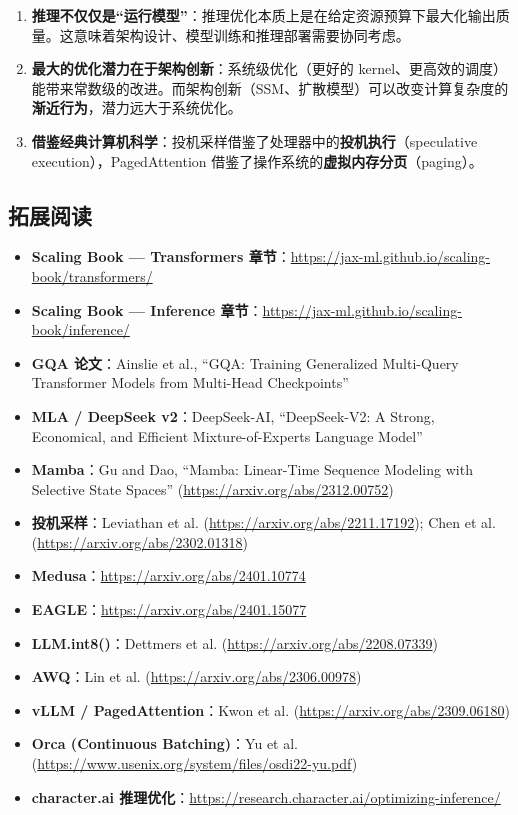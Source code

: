 \documentclass[a4paper]{article}
\begin{document}
\begin{enumerate}
    \item \textbf{推理不仅仅是``运行模型''}：推理优化本质上是在给定资源预算下最大化输出质量。这意味着架构设计、模型训练和推理部署需要协同考虑。

    \item \textbf{最大的优化潜力在于架构创新}：系统级优化（更好的 kernel、更高效的调度）能带来常数级的改进。而架构创新（SSM、扩散模型）可以改变计算复杂度的\textbf{渐近行为}，潜力远大于系统优化。

    \item \textbf{借鉴经典计算机科学}：投机采样借鉴了处理器中的\textbf{投机执行}（speculative execution），PagedAttention 借鉴了操作系统的\textbf{虚拟内存分页}（paging）。
\end{enumerate}

\subsection{拓展阅读}

\begin{itemize}
    \item \textbf{Scaling Book --- Transformers 章节}：\url{https://jax-ml.github.io/scaling-book/transformers/}
    \item \textbf{Scaling Book --- Inference 章节}：\url{https://jax-ml.github.io/scaling-book/inference/}
    \item \textbf{GQA 论文}：Ainslie et al., ``GQA: Training Generalized Multi-Query Transformer Models from Multi-Head Checkpoints''
    \item \textbf{MLA / DeepSeek v2}：DeepSeek-AI, ``DeepSeek-V2: A Strong, Economical, and Efficient Mixture-of-Experts Language Model''
    \item \textbf{Mamba}：Gu and Dao, ``Mamba: Linear-Time Sequence Modeling with Selective State Spaces'' (\url{https://arxiv.org/abs/2312.00752})
    \item \textbf{投机采样}：Leviathan et al. (\url{https://arxiv.org/abs/2211.17192}); Chen et al. (\url{https://arxiv.org/abs/2302.01318})
    \item \textbf{Medusa}：\url{https://arxiv.org/abs/2401.10774}
    \item \textbf{EAGLE}：\url{https://arxiv.org/abs/2401.15077}
    \item \textbf{LLM.int8()}：Dettmers et al. (\url{https://arxiv.org/abs/2208.07339})
    \item \textbf{AWQ}：Lin et al. (\url{https://arxiv.org/abs/2306.00978})
    \item \textbf{vLLM / PagedAttention}：Kwon et al. (\url{https://arxiv.org/abs/2309.06180})
    \item \textbf{Orca (Continuous Batching)}：Yu et al. (\url{https://www.usenix.org/system/files/osdi22-yu.pdf})
    \item \textbf{character.ai 推理优化}：\url{https://research.character.ai/optimizing-inference/}
\end{itemize}
\end{document}
